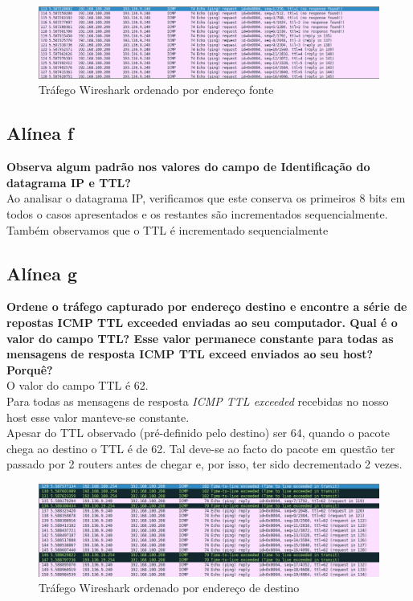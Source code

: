 \documentclass[a4paper]{report}
\begin{document}
\begin{figure}[H]
    \centering 
    \includegraphics[width=\textwidth]{images/wiresharkSourceEx2.png}
    \caption{Tráfego Wireshark ordenado por endereço fonte}
    \label{fig:wiresharkSourceEx2}
\end{figure}
\subsection{Alínea f}
\textbf{Observa algum padrão nos valores do campo de Identificação do datagrama
IP e TTL?}\\
Ao analisar o datagrama IP, verificamos que este conserva os primeiros 8 bits em
todos o casos apresentados e os restantes são incrementados sequencialmente.\\
Também observamos que o TTL é incrementado sequencialmente

\subsection{Alínea g}
\textbf{Ordene o tráfego capturado por endereço destino e encontre a série de
repostas ICMP TTL exceeded enviadas ao seu computador. Qual é o valor do campo
TTL? Esse valor permanece constante para todas as mensagens de resposta ICMP TTL
exceed enviados ao seu host? Porquê?}\\
O valor do campo TTL é 62.\\
Para todas as mensagens de resposta \textit{ICMP TTL exceeded} recebidas no
nosso host esse valor manteve-se constante.\\
Apesar do TTL observado (pré-definido pelo destino) ser 64, quando o pacote chega ao
destino o TTL é de 62. Tal deve-se ao facto do pacote em questão ter passado por
2 routers antes de chegar e, por isso, ter sido decrementado 2 vezes.

\begin{figure}[H]
    \centering 
    \includegraphics[width=\textwidth]{images/wiresharkDestinyEx2.png}
    \caption{Tráfego Wireshark ordenado por endereço de destino}
    \label{fig:wiresharkDestinyEx2}
\end{figure}
\end{document}
